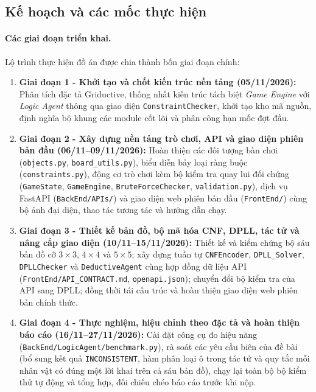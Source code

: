 \subsection{Kế hoạch và các mốc thực hiện}
\label{subsec:project_plan}
\begin{sloppypar}

\paragraph{Các giai đoạn triển khai.}
Lộ trình thực hiện đồ án được chia thành bốn giai đoạn chính:
\begin{enumerate}
    \item \textbf{Giai đoạn 1 - Khởi tạo và chốt kiến trúc nền tảng (05/11/2026):}
    Phân tích đặc tả Griductive, thống nhất kiến trúc tách biệt \textit{Game Engine} với \textit{Logic Agent} thông qua giao diện \texttt{ConstraintChecker}, khởi tạo kho mã nguồn, định nghĩa bộ khung các module cốt lõi và phân công hạn mốc đợt đầu.

    \item \textbf{Giai đoạn 2 - Xây dựng nền tảng trò chơi, API và giao diện phiên bản đầu (06/11--09/11/2026):}
    Hoàn thiện các đối tượng bàn chơi (\texttt{objects.py}, \texttt{board\_utils.py}), biểu diễn bảy loại ràng buộc (\texttt{constraints.py}), động cơ trò chơi kèm bộ kiểm tra quay lui đối chứng (\texttt{GameState}, \texttt{GameEngine}, \texttt{BruteForceChecker}, \texttt{validation.py}), dịch vụ FastAPI (\nolinkurl{BackEnd/APIs/}) và giao diện web phiên bản đầu (\nolinkurl{FrontEnd/}) cùng bộ ảnh đại diện, thao tác tương tác và hướng dẫn chạy.

    \item \textbf{Giai đoạn 3 - Thiết kế bản đồ, bộ mã hóa CNF, DPLL, tác tử và nâng cấp giao diện (10/11--15/11/2026):}
    Thiết kế và kiểm chứng bộ sáu bản đồ cỡ $3\times3$, $4\times4$ và $5\times5$; xây dựng tuần tự \texttt{CNFEncoder}, \texttt{DPLL\_Solver}, \texttt{DPLLChecker} và \texttt{DeductiveAgent} cùng hợp đồng dữ liệu API (\nolinkurl{FrontEnd/API_CONTRACT.md}, \nolinkurl{openapi.json}); chuyển đổi bộ kiểm tra của API sang DPLL; đồng thời tái cấu trúc và hoàn thiện giao diện web phiên bản chính thức.

    \item \textbf{Giai đoạn 4 - Thực nghiệm, hiệu chỉnh theo đặc tả và hoàn thiện báo cáo (16/11--27/11/2026):}
    Cài đặt công cụ đo hiệu năng (\nolinkurl{BackEnd/LogicAgent/benchmark.py}), rà soát các yêu cầu biên của đề bài (bổ sung kết quả \texttt{INCONSISTENT}, hàm phân loại ô trong tác tử và quy tắc mỗi nhân vật có đúng một lời khai trên cả sáu bản đồ), chạy lại toàn bộ bộ kiểm thử tự động và tổng hợp, đối chiếu chéo báo cáo trước khi nộp.
\end{enumerate}


\end{sloppypar}
